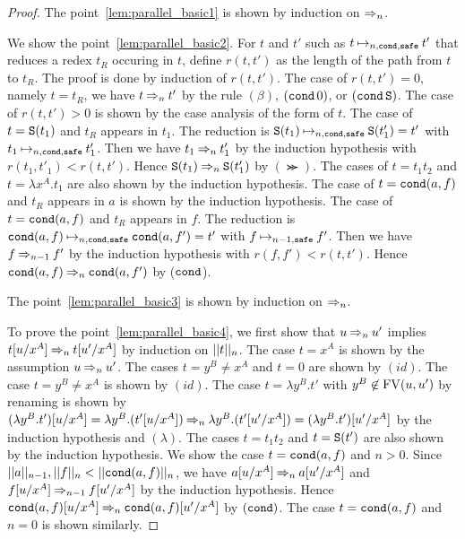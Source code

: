 \begin{proof}
  The point~\ref{lem:parallel_basic1} is shown by induction on $\nsafePReduces{n}$.
  
  We show the point~\ref{lem:parallel_basic2}.
  For $t$ and $t'$ such as $t\nsafeReduces{n,\cond} t'$
  that reduces a redex $t_R$ occuring in $t$, 
  define $r(t,t')$ as the length of the path from $t$ to $t_R$.
  The proof is done by induction of $r(t,t')$.
  The case of $r(t,t') = 0$, namely $t = t_R$,
  we have $t \nsafePReduces{n} t'$ by the rule $(\beta)$, $(\cond\,0)$,
  or $(\cond\,\Succ)$. 
  The case of $r(t,t') > 0$ is shown by the case analysis of the form of $t$.
  The case of $t=\Suc{t_1}$ and $t_R$ appears in $t_1$.
  The reduction is $\Suc{t_1} \nsafeReduces{n,\cond} \Suc{t'_1} = t'$ with $t_1 \nsafeReduces{n,\cond} t'_1$. 
  Then we have $t_1 \nsafePReduces{n} t'_1$ by the induction hypothesis with $r(t_1,t'_1) < r(t,t')$.
  Hence $\Suc{t_1} \nsafePReduces{n} \Suc{t'_1}$ by $(\Succ)$. 
  The cases of $t=t_1t_2$ and $t=\lambda x^A.t_1$ are also shown by the induction hypothesis. 
  The case of $t=\Cond{a}{f}$ and $t_R$ appears in $a$ is shown by the induction hypothesis.
  The case of $t=\Cond{a}{f}$ and $t_R$ appears in $f$.
  The reduction is $\Cond{a}{f} \nsafeReduces{n,\cond} \Cond{a}{f'} = t'$ with $f \nsafeReduces{n-1} f'$. 
  Then we have $f \nsafePReduces{n-1} f'$ by the induction hypothesis with $r(f,f') < r(t,t')$.
  Hence $\Cond{a}{f} \nsafePReduces{n} \Cond{a}{f'}$ by ($\cond$).

  The point~\ref{lem:parallel_basic3} is shown by induction on $\nsafePReduces{n}$. 

  To prove the point~\ref{lem:parallel_basic4}, we first show that
  $u \nsafePReduces{n} u'$ implies $t[u/x^A] \nsafePReduces{n} t[u'/x^A]$ by induction on $\Lv{n}{t}$.
  The case $t=x^A$ is shown by the assumption $u \nsafePReduces{n} u'$.
  The cases $t=y^B\neq x^A$ and $t=0$ are shown by $(id)$. 
  The case $t=y^B\neq x^A$ is shown by $(id)$.   
  The case $t=\lambda y^B.t'$ with $y^B\not\in\FV(u,u')$ by renaming is shown by
  $(\lambda y^B.t')[u/x^A] = \lambda y^B.(t'[u/x^A]) \nsafePReduces{n} \lambda y^B.(t'[u'/x^A]) = (\lambda y^B.t')[u'/x^A]$ by the induction hypothesis and $(\lambda)$.
  The cases $t=t_1t_2$ and $t=\Suc{t'}$ are also shown by the induction hypothesis.
  We show the case $t=\Cond{a}{f}$ and $n>0$. 
  Since $\Lv{n-1}{a}, \Lv{n}{f} < \Lv{n}{\Cond{a}{f}}$, 
  we have $a[u/x^A] \nsafePReduces{n} a[u'/x^A]$ and $f[u/x^A] \nsafePReduces{n-1} f[u'/x^A]$
  by the induction hypothesis. Hence $\Cond{a}{f}[u/x^A] \nsafePReduces{n} \Cond{a}{f}[u'/x^A]$ by $(\cond)$. 
  The case $t=\Cond{a}{f}$ and $n=0$ is shown similarly. 


\end{proof}
